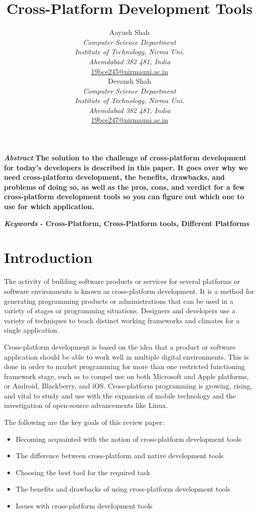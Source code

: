 \documentclass[11pt]{article}
\title{\huge Cross-Platform Development Tools}
\author{Aayush Shah \\
  \emph{Computer Science Department} \\
  \emph{Institute of Technology, Nirma Uni.} \\
  \emph{Ahemdabad 382 481, India} \\
  {\href{mailto:19bce245@nirmauni.ac.in?subject=Came-from-SE-Term-paper}{19bce245@nirmauni.ac.in}} \\\And
  Devansh Shah \\
  \emph{Computer Science Department} \\
 \emph{Institute of Technology, Nirma Uni.} \\
  \emph{Ahemdabad 382 481, India} \\
  {\href{mailto:19bce247@nirmauni.ac.in?subject=Came-from-SE-Term-paper}{19bce247@nirmauni.ac.in}} \\}
\date{}
\begin{document}
\maketitle
\textbf{\emph{Abstract}}
  \textbf{The solution to the challenge of cross-platform development for today's developers is described in this paper. It goes over why we need cross-platform development, the benefits, drawbacks, and problems of doing so, as well as the pros, cons, and verdict for a few cross-platform development tools so you can figure out which one to use for which application.}
  
  \textbf{\emph{Keywords} - Cross-Platform, Cross-Platform tools, Different Platforms}
  
  

\section{Introduction}

The activity of building software products or services for several platforms or software environments is known as cross-platform development. It is a method for generating programming products or administrations that can be used in a variety of stages or programming situations. Designers and developers use a variety of techniques to teach distinct working frameworks and climates for a single application.

Cross-platform development is based on the idea that a product or software application should be able to work well in multiple digital environments. This is done in order to market programming for more than one restricted functioning framework stage, such as to compel use on both Microsoft and Apple platforms, or Android, Blackberry, and iOS. Cross-platform programming is growing, rising, and vital to study and use with the expansion of mobile technology and the investigation of open-source advancements like Linux.\cite{hackernoon}

The following are the key goals of this review paper:

\begin{itemize}
  \setlength{\itemsep}{0mm}  
  \item Becoming acquainted with the notion of cross-platform development tools
  \item The difference between cross-platform and native development tools
  \item Choosing the best tool for the required task
  \item The benefits and drawbacks of using cross-platform development tools
  \item Issues with cross-platform development tools
\end{itemize}
\end{document}
